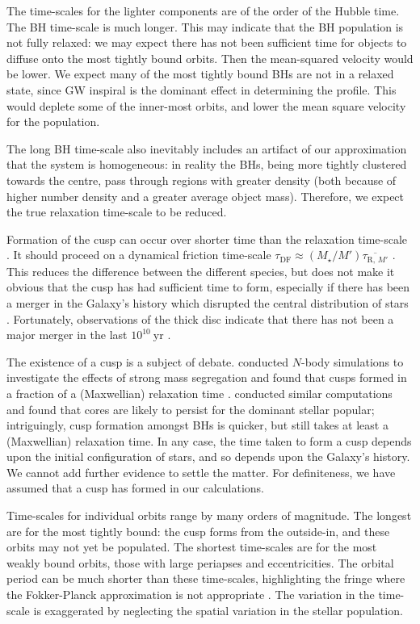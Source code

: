 \documentclass[useAMS,usedcolumn,usegraphicx,usenatbib]{mn2e}
\newcommand{\units}[1]{\ensuremath{~\mathrm{#1}}}
\newcommand{\sub}[1]{\ensuremath{_\mathrm{#1}}}
\begin{document}
\begin{onecolumn}
The time-scales for the lighter components are of the order of the Hubble time. The BH time-scale is much longer. This may indicate that the BH population is not fully relaxed: we may expect there has not been sufficient time for objects to diffuse onto the most tightly bound orbits. Then the mean-squared velocity would be lower. We expect many of the most tightly bound BHs are not in a relaxed state, since GW inspiral is the dominant effect in determining the profile. This would deplete some of the inner-most orbits, and lower the mean square velocity for the population.

The long BH time-scale also inevitably includes an artifact of our approximation that the system is homogeneous: in reality the BHs, being more tightly clustered towards the centre, pass through regions with greater density (both because of higher number density and a greater average object mass). Therefore, we expect the true relaxation time-scale to be reduced.

Formation of the cusp can occur over shorter time than the relaxation time-scale \citep{Bar-Or2012}. It should proceed on a dynamical friction time-scale $\tau\sub{DF} \approx (M_\star/M')\overline{\tau_{\mathrm{R},\,M'}}$ \citep[section 3.4]{Spitzer1987}. This reduces the difference between the different species, but does not make it obvious that the cusp has had sufficient time to form, especially if there has been a merger in the Galaxy's history which disrupted the central distribution of stars \citep{Gualandris2012}. Fortunately, observations of the thick disc indicate that there has not been a major merger in the last $10^{10}\units{yr}$ \citep{Wyse2008}.

The existence of a cusp is a subject of debate. \citet{Preto2010} conducted $N$-body simulations to investigate the effects of strong mass segregation \citep{Alexander2009, Keshet2009} and found that cusps formed in a fraction of a (Maxwellian) relaxation time \citep{Amaro-Seoane2011}. \citet{Gualandris2012} conducted similar computations and found that cores are likely to persist for the dominant stellar popular; intriguingly, cusp formation amongst BHs is quicker, but still takes at least a (Maxwellian) relaxation time. In any case, the time taken to form a cusp depends upon the initial configuration of stars, and so depends upon the Galaxy's history. We cannot add further evidence to settle the matter. For definiteness, we have assumed that a cusp has formed in our calculations.

Time-scales for individual orbits range by many orders of magnitude. The longest are for the most tightly bound: the cusp forms from the outside-in, and these orbits may not yet be populated. The shortest time-scales are for the most weakly bound orbits, those with large periapses and eccentricities. The orbital period can be much shorter than these time-scales, highlighting the fringe where the Fokker-Planck approximation is not appropriate \citep{Spitzer1972}. The variation in the time-scale is exaggerated by neglecting the spatial variation in the stellar population.


\end{onecolumn}
\end{document}
